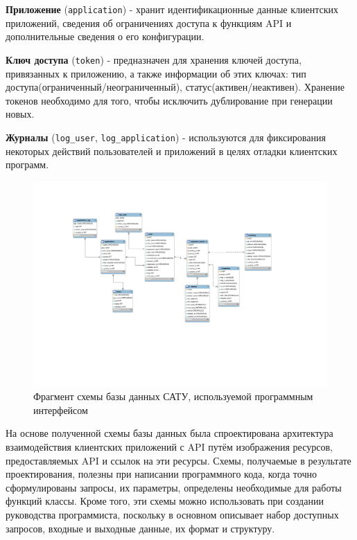 	\textbf{Приложение} (\texttt{application}) - хранит идентификационные данные клиентских приложений, сведения об ограничениях доступа к функциям API и дополнительные сведения о его конфигурации.

	\textbf{Ключ доступа} (\texttt{token}) - предназначен для хранения ключей доступа, привязанных к приложению, а также информации об этих ключах: тип доступа(ограниченный/неограниченный), статус(активен/неактивен). Хранение токенов необходимо для того, чтобы исключить дублирование при генерации новых.

	\textbf{Журналы} (\texttt{log\_user}, \texttt{log\_application}) - используются для фиксирования некоторых действий пользователей и приложений в целях отладки клиентских программ.

	\pagebreak

	\begin{landscape}

		\begin{figure}[t!]
		      \centering
		      \includegraphics[width=1.3\textwidth]{images/erd/1}
		      \caption{Фрагмент схемы базы данных САТУ, используемой программным интерфейсом}
		      \label{erd:1}
		\end{figure}

	\end{landscape}

	\pagebreak

	На основе полученной схемы базы данных была спроектирована архитектура взаимодействия клиентских приложений с API путём изображения ресурсов, предоставляемых API и ссылок на эти ресурсы. Схемы, получаемые в результате проектирования, полезны при написании программного кода, когда точно сформулированы запросы, их параметры, определены необходимые для работы функций классы. Кроме того, эти схемы можно использовать при создании руководства программиста, поскольку в основном описывает набор доступных запросов, входные и выходные данные, их формат и структуру.


